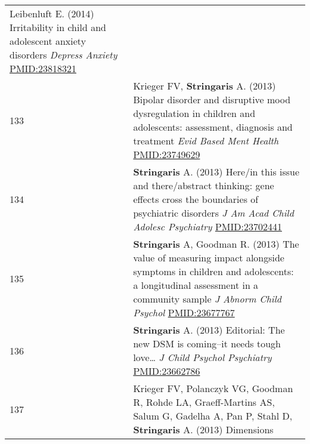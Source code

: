 \documentclass[
]{article}
\begin{document}
\begin{longtable}[]{@{}ll@{}}
\begin{minipage}[t]{0.94\columnwidth}
Leibenluft E. (2014) Irritability in child and adolescent anxiety
disorders \emph{Depress Anxiety} \url{PMID:23818321}\strut
\end{minipage}\tabularnewline
\begin{minipage}[t]{0.01\columnwidth}\raggedright
133\strut
\end{minipage} & \begin{minipage}[t]{0.94\columnwidth}\raggedright
Krieger FV, \textbf{Stringaris} A. (2013) Bipolar disorder and
disruptive mood dysregulation in children and adolescents: assessment,
diagnosis and treatment \emph{Evid Based Ment Health}
\url{PMID:23749629}\strut
\end{minipage}\tabularnewline
\begin{minipage}[t]{0.01\columnwidth}\raggedright
134\strut
\end{minipage} & \begin{minipage}[t]{0.94\columnwidth}\raggedright
\textbf{Stringaris} A. (2013) Here/in this issue and there/abstract
thinking: gene effects cross the boundaries of psychiatric disorders
\emph{J Am Acad Child Adolesc Psychiatry} \url{PMID:23702441}\strut
\end{minipage}\tabularnewline
\begin{minipage}[t]{0.01\columnwidth}\raggedright
135\strut
\end{minipage} & \begin{minipage}[t]{0.94\columnwidth}\raggedright
\textbf{Stringaris} A, Goodman R. (2013) The value of measuring impact
alongside symptoms in children and adolescents: a longitudinal
assessment in a community sample \emph{J Abnorm Child Psychol}
\url{PMID:23677767}\strut
\end{minipage}\tabularnewline
\begin{minipage}[t]{0.01\columnwidth}\raggedright
136\strut
\end{minipage} & \begin{minipage}[t]{0.94\columnwidth}\raggedright
\textbf{Stringaris} A. (2013) Editorial: The new DSM is coming--it needs
tough love\ldots{} \emph{J Child Psychol Psychiatry}
\url{PMID:23662786}\strut
\end{minipage}\tabularnewline
\begin{minipage}[t]{0.01\columnwidth}\raggedright
137\strut
\end{minipage} & \begin{minipage}[t]{0.94\columnwidth}\raggedright
Krieger FV, Polanczyk VG, Goodman R, Rohde LA, Graeff-Martins AS, Salum
G, Gadelha A, Pan P, Stahl D, \textbf{Stringaris} A. (2013) Dimensions

\end{minipage}
\end{longtable}
\end{document}
